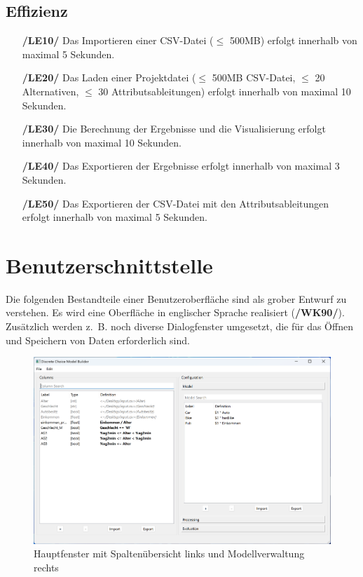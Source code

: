 \documentclass{article}
\begin{document}
\subsection{Effizienz}
\begin{itemize}
    \item[\textbf{/LE10/}] Das Importieren einer CSV-Datei ($\leq$ 500MB) erfolgt innerhalb von maximal 5 Sekunden.
    \item[\textbf{/LE20/}] Das Laden einer Projektdatei ($\leq$ 500MB CSV-Datei, $\leq$ 20 Alternativen, $\leq$ 30 Attributsableitungen) erfolgt innerhalb von maximal 10 Sekunden.
    \item[\textbf{/LE30/}] Die Berechnung der Ergebnisse und die Visualisierung erfolgt innerhalb von maximal 10 Sekunden.
    \item[\textbf{/LE40/}] Das Exportieren der Ergebnisse erfolgt innerhalb von maximal 3 Sekunden.
    \item[\textbf{/LE50/}] Das Exportieren der CSV-Datei mit den Attributsableitungen erfolgt innerhalb von maximal 5 Sekunden.
\end{itemize}

\clearpage
\section{Benutzerschnittstelle}

Die folgenden Bestandteile einer Benutzeroberfläche sind als grober Entwurf zu verstehen. Es wird eine Oberfläche in englischer Sprache realisiert (\textbf{/WK90/}). Zusätzlich werden z.~B. noch diverse Dialogfenster umgesetzt, die für das Öffnen und Speichern von Daten erforderlich sind.\\

\begin{figure}[H]%
  \centering
  \includegraphics[width=12cm]{specifications/img/gui-screenshots/columns+model.png}
  \caption{Hauptfenster mit Spaltenübersicht links und Modellverwaltung rechts}
  \label{gui:fig_columns+model}
\end{figure}
\end{document}

